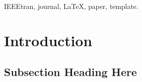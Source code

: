\documentclass[conference]{IEEEtran}
\begin{document}




\maketitle


\begin{abstract}
\blindtext[1]
\end{abstract}

\begin{IEEEkeywords}
IEEEtran, journal, \LaTeX, paper, template.
\end{IEEEkeywords}






%
\IEEEpeerreviewmaketitle



\section{Introduction}
\blindtext

\subsection{Subsection Heading Here}
\blindtext

\end{document}
